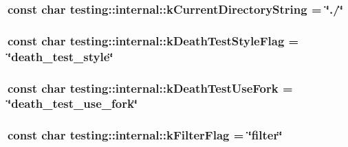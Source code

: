 \hypertarget{namespacetesting_1_1internal_af0c1ffec2a97f6094e956d46c07f0b5d}{
\subsubsection[{k\-Current\-Directory\-String}]{\setlength{\rightskip}{0pt plus 5cm}const char testing\-::internal\-::k\-Current\-Directory\-String = \char`\"{}./\char`\"{}}}\label{namespacetesting_1_1internal_af0c1ffec2a97f6094e956d46c07f0b5d}
\hypertarget{namespacetesting_1_1internal_a8be730bac57cfd5a92d4aeea57ad499e}{
\subsubsection[{k\-Death\-Test\-Style\-Flag}]{\setlength{\rightskip}{0pt plus 5cm}const char testing\-::internal\-::k\-Death\-Test\-Style\-Flag = \char`\"{}death\-\_\-test\-\_\-style\char`\"{}}}\label{namespacetesting_1_1internal_a8be730bac57cfd5a92d4aeea57ad499e}
\hypertarget{namespacetesting_1_1internal_aefe557a4dfcfd1cb9c7046a26b3c28bb}{
\subsubsection[{k\-Death\-Test\-Use\-Fork}]{\setlength{\rightskip}{0pt plus 5cm}const char testing\-::internal\-::k\-Death\-Test\-Use\-Fork = \char`\"{}death\-\_\-test\-\_\-use\-\_\-fork\char`\"{}}}\label{namespacetesting_1_1internal_aefe557a4dfcfd1cb9c7046a26b3c28bb}
\hypertarget{namespacetesting_1_1internal_a81f3deec3ebb5c25e9e71f0ec088302c}{
\subsubsection[{k\-Filter\-Flag}]{\setlength{\rightskip}{0pt plus 5cm}const char testing\-::internal\-::k\-Filter\-Flag = \char`\"{}filter\char`\"{}}}\label{namespacetesting_1_1internal_a81f3deec3ebb5c25e9e71f0ec088302c}
